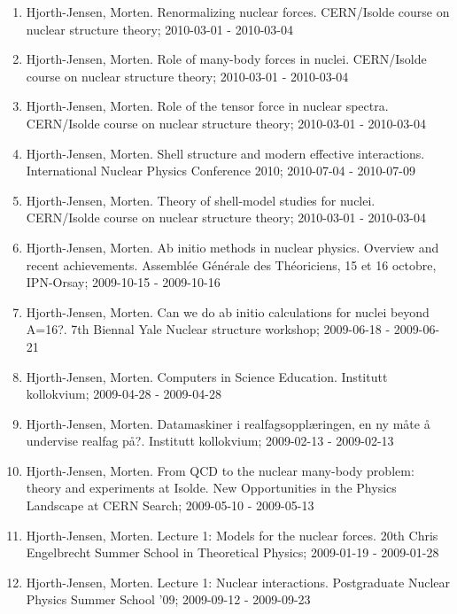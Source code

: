 \documentclass[%
oneside,                 %
final,                   %
10pt]{article}
\begin{document}
\begin{enumerate}
\item Hjorth-Jensen, Morten.  Renormalizing nuclear forces. CERN/Isolde course on nuclear structure theory; 2010-03-01 - 2010-03-04

\item Hjorth-Jensen, Morten.  Role of many-body forces in nuclei. CERN/Isolde course on nuclear structure theory; 2010-03-01 - 2010-03-04

\item Hjorth-Jensen, Morten.  Role of the tensor force in nuclear spectra. CERN/Isolde course on nuclear structure theory; 2010-03-01 - 2010-03-04

\item Hjorth-Jensen, Morten.  Shell structure and modern effective interactions. International Nuclear Physics Conference 2010; 2010-07-04 - 2010-07-09

\item Hjorth-Jensen, Morten.  Theory of shell-model studies for nuclei. CERN/Isolde course on nuclear structure theory; 2010-03-01 - 2010-03-04

\item Hjorth-Jensen, Morten.  Ab initio methods in nuclear physics. Overview and recent achievements. Assemblée Générale des Théoriciens, 15 et 16 octobre, IPN-Orsay; 2009-10-15 - 2009-10-16

\item Hjorth-Jensen, Morten.  Can we do ab initio calculations for nuclei beyond A=16?. 7th Biennal Yale Nuclear structure workshop; 2009-06-18 - 2009-06-21

\item Hjorth-Jensen, Morten.  Computers in Science Education. Institutt kollokvium; 2009-04-28 - 2009-04-28

\item Hjorth-Jensen, Morten.  Datamaskiner i realfagsopplæringen, en ny måte å undervise realfag på?. Institutt kollokvium; 2009-02-13 - 2009-02-13

\item Hjorth-Jensen, Morten.  From QCD to the nuclear many-body problem: theory and experiments at Isolde. New Opportunities in the Physics Landscape at CERN Search; 2009-05-10 - 2009-05-13

\item Hjorth-Jensen, Morten.  Lecture 1: Models for the nuclear forces. 20th Chris Engelbrecht Summer School in Theoretical Physics; 2009-01-19 - 2009-01-28

\item Hjorth-Jensen, Morten.  Lecture 1: Nuclear interactions. Postgraduate Nuclear Physics Summer School '09; 2009-09-12 - 2009-09-23


\end{enumerate}
\end{document}
